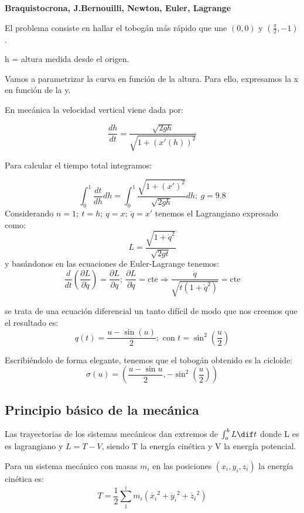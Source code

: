 \begin{example}
\textbf{Braquistocrona, J.Bernouilli, Newton, Euler, Lagrange}

El problema consiste en hallar el tobogán más rápido que une $(0,0)$ y $(\frac{\pi}{2},-1)$.

h = altura medida desde el origen.

Vamos a parametrizar la curva en función de la altura. Para ello, expresamos la x en función de la y.

En mecánica la velocidad vertical viene dada por:

$$\frac{dh}{dt} = \frac{\sqrt{2gh}}{\sqrt{1+(x'(h))^2}}$$

Para calcular el tiempo total integramos:

$$\int_0^1 \frac{dt}{dh} dh = \int_0^1 \frac{\sqrt{1 + (x')^2}}{\sqrt{2gh}} dh; \  g = 9.8$$
Considerando $n=1; \  t=h; \  q=x; \   \dot{q}=x'$ tenemos el Lagrangiano expresado como:
$$L = \frac{\sqrt{1+\dot{q}^2}}{\sqrt{2gt}} $$
y basándonos en las ecuaciones de Euler-Lagrange tenemos:
$$\frac{d}{dt} \left(\frac{\partial L}{\partial \dot{q}}\right) = \frac{\partial L}{\partial q}; \  \frac{\partial L}{\partial \dot{q}} = \text{cte} \Rightarrow \frac{\dot{q}}{\sqrt{t(1+\dot{q}^2)}} = \text{cte} $$

se trata de una ecuación diferencial un tanto difícil de modo que nos creemos que el resultado es:
$$ q(t) = \frac{u - \sin(u)}{2}; \text{ con } t=\sin^2\left(\frac{u}{2}\right) $$

Escribiéndolo de forma elegante, tenemos que el tobogán obtenido es la cicloide:
$$ \sigma (u) = \left( \frac{u - \sin{u}}{2}, -\sin^2\left(\frac{u}{2}\right) \right) $$

\end{example}


\subsection{Principio básico de la mecánica}
\begin{theorem}
	Las trayectorias de los sistemas mecánicos dan extremos de $\int_a^b L \dif t$ donde L es es lagrangiano y $L= T-V$, siendo T la energía cinética y V la energía potencial.
\end{theorem}
\begin{defn}
	Para un sistema mecánico con masas $m_i$ en las posiciones $(x_i,y_i,z_i)$ la energía cinética es:$$T = \frac{1}{2} \sum_{1}^{i} m_i(\dot{x_i}^2 + \dot{y_i}^2 + \dot{z_i}^2)$$
\end{defn}

